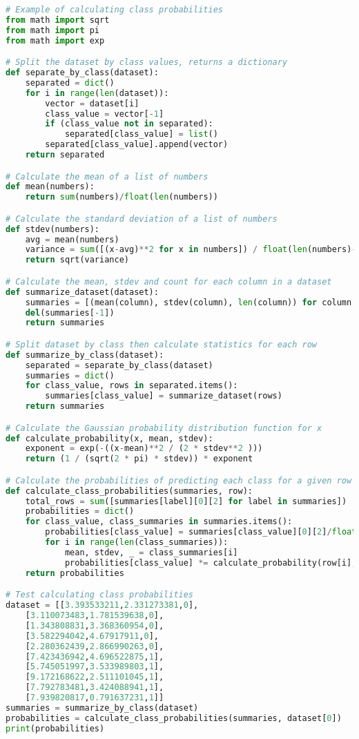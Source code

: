 \documentclass[12pt]{article}
\begin{document}
\begin{lstlisting}[language=python]
# Example of calculating class probabilities
from math import sqrt
from math import pi
from math import exp

# Split the dataset by class values, returns a dictionary
def separate_by_class(dataset):
	separated = dict()
	for i in range(len(dataset)):
		vector = dataset[i]
		class_value = vector[-1]
		if (class_value not in separated):
			separated[class_value] = list()
		separated[class_value].append(vector)
	return separated

# Calculate the mean of a list of numbers
def mean(numbers):
	return sum(numbers)/float(len(numbers))

# Calculate the standard deviation of a list of numbers
def stdev(numbers):
	avg = mean(numbers)
	variance = sum([(x-avg)**2 for x in numbers]) / float(len(numbers)-1)
	return sqrt(variance)

# Calculate the mean, stdev and count for each column in a dataset
def summarize_dataset(dataset):
	summaries = [(mean(column), stdev(column), len(column)) for column in zip(*dataset)]
	del(summaries[-1])
	return summaries

# Split dataset by class then calculate statistics for each row
def summarize_by_class(dataset):
	separated = separate_by_class(dataset)
	summaries = dict()
	for class_value, rows in separated.items():
		summaries[class_value] = summarize_dataset(rows)
	return summaries

# Calculate the Gaussian probability distribution function for x
def calculate_probability(x, mean, stdev):
	exponent = exp(-((x-mean)**2 / (2 * stdev**2 )))
	return (1 / (sqrt(2 * pi) * stdev)) * exponent

# Calculate the probabilities of predicting each class for a given row
def calculate_class_probabilities(summaries, row):
	total_rows = sum([summaries[label][0][2] for label in summaries])
	probabilities = dict()
	for class_value, class_summaries in summaries.items():
		probabilities[class_value] = summaries[class_value][0][2]/float(total_rows)
		for i in range(len(class_summaries)):
			mean, stdev, _ = class_summaries[i]
			probabilities[class_value] *= calculate_probability(row[i], mean, stdev)
	return probabilities

# Test calculating class probabilities
dataset = [[3.393533211,2.331273381,0],
	[3.110073483,1.781539638,0],
	[1.343808831,3.368360954,0],
	[3.582294042,4.67917911,0],
	[2.280362439,2.866990263,0],
	[7.423436942,4.696522875,1],
	[5.745051997,3.533989803,1],
	[9.172168622,2.511101045,1],
	[7.792783481,3.424088941,1],
	[7.939820817,0.791637231,1]]
summaries = summarize_by_class(dataset)
probabilities = calculate_class_probabilities(summaries, dataset[0])
print(probabilities)

\end{lstlisting}
\end{document}
